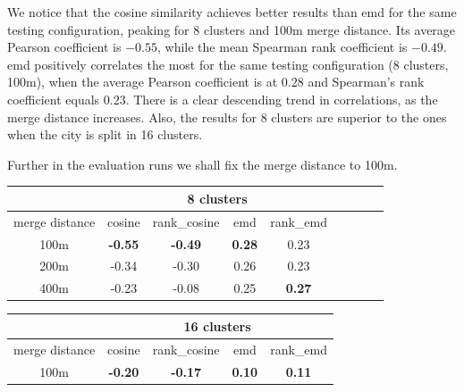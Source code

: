 We notice that the cosine similarity achieves better results than emd for the same testing configuration, peaking for 8 clusters and 100m merge distance. Its average Pearson coefficient is $-0.55$, while the mean Spearman rank coefficient is $-0.49$. emd positively correlates the most for the same testing configuration (8 clusters, 100m), when the average Pearson coefficient is at $0.28$ and Spearman's rank coefficient equals $0.23$. There is a clear descending trend in correlations, as the merge distance increases.  Also, the results for 8 clusters are superior to the ones when the city is split in 16 clusters. 

Further in the evaluation runs we shall fix the merge distance to 100m.

\begin{table}[!ht]
		{\begin{tabular}{ | c | c | c | c | c | c | c | c | c |}
			\hline
			{} & \multicolumn{4}{c|}{8 clusters} \\ \hline
			{merge distance} & cosine & rank\_cosine & emd & rank\_emd \\ \hline
			100m & \textbf{-0.55} & \textbf{-0.49} & \textbf{0.28} & 0.23 \\ \hline
			200m & -0.34 & -0.30 & 0.26	& 0.23 \\ \hline
			400m & -0.23 & -0.08 & 0.25 & \textbf{0.27} \\ \hline
		\end{tabular}}
		\vspace{3em}
		{\begin{tabular}{ | c | c | c | c | c | }
			\hline
			{} & \multicolumn{4}{c|}{16 clusters} \\ \hline
			{merge distance} & cosine & rank\_cosine & emd & rank\_emd \\ \hline
			100m & \textbf{-0.20} & \textbf{-0.17} & \textbf{0.10} & \textbf{0.11} \\ \hline

\end{tabular}}
\end{table}
